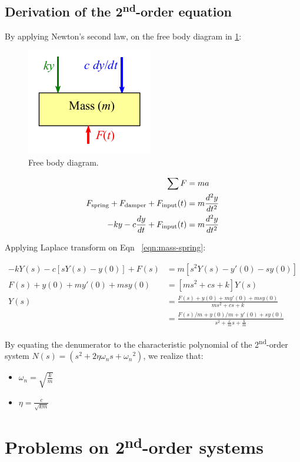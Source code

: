 \documentclass[a4paper,11pt,dvipsnames]{book}
\begin{document}
\subsection*{Derivation of the 2\textsuperscript{nd}-order equation}

By applying Newton's second law, on the free body diagram in \ref{fig:freebody}:

\begin{figure}[h!]\label{fig:freebody}
\centering
  \includegraphics[width=0.3\linewidth]{newton}
  \caption{Free body diagram.} 
\end{figure}

\begin{align}
\sum F &= m a \\ 
F_{\rm spring} + F_{\rm damper} + F_{\rm input}(t) &= m \frac{d^2y}{dt^2} \\ 
-ky -c \frac{dy}{dt} + F_{\rm input}(t) &= m \frac{d^2y}{dt^2} \label{eqn:mass-spring}
\end{align}

Applying Laplace transform on Eqn ~\ref{eqn:mass-spring}:

\begin{align*}
-kY(s) - c\left[sY(s)-y(0)\right] + F(s) &= m\left[s^2Y(s)-y'(0)-sy(0)\right] \\
F(s) + y(0) + my'(0)+msy(0) &= \left[ms^2+cs+k\right]Y(s) \\
Y(s) &= \frac{F(s) + y(0) + my'(0)+msy(0)}{ms^2+cs+k} \\
&= \frac{F(s)/m + y(0)/m + y'(0)+sy(0)}{s^2+\frac{c}{m}s+ \frac{k}{m}}
\end{align*}

By equating the denumerator to the characteristic polynomial of the 2\textsuperscript{nd}-order system $N(s)=(s^2 + 2 \eta \omega_n s + {\omega_n}^2)$, we realize that:
\begin{itemize}
\item $\omega_n=\sqrt{\frac{k}{m}}$
\item $\eta = \frac{c}{\sqrt{km}}$
\end{itemize} 



\section*{Problems on 2\textsuperscript{nd}-order systems}
\end{document}
